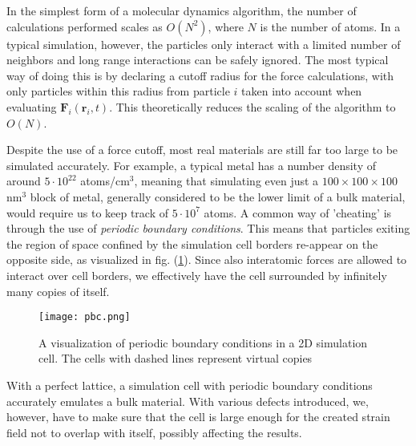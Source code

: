 In the simplest form of a molecular dynamics algorithm, the number of calculations performed scales as $O(N^2)$, where $N$ is the number of atoms. 
In a typical simulation, however, the particles only interact with a limited number of neighbors and long range interactions can be safely ignored. 
The most typical way of doing this is by declaring a cutoff radius for the force calculations, with only particles within this radius from particle $i$ taken into account when evaluating $\mathbf{F}_i(\mathbf{r}_i,t)$. 
This theoretically reduces the scaling of the algorithm to $O(N)$.

Despite the use of a force cutoff, most real materials are still far too large to be simulated accurately.
For example, a typical metal has a number density of around $5\cdot 10^{22}$ atoms/cm$^3$, meaning that simulating even just a $100\times 100 \times 100$ nm$^3$ block of metal, generally considered to be the lower limit of a bulk material, would require us to keep track of $5\cdot 10^7$ atoms.
A common way of 'cheating' is through the use of \textit{periodic boundary conditions}. 
This means that particles exiting the region of space confined by the simulation cell borders re-appear on the opposite side, as visualized in fig. (\ref{Fig:pbcs}). 
Since also interatomic forces are allowed to interact over cell borders, we effectively have the cell surrounded by infinitely many copies of itself.

\begin{figure}[!ht]
\center
\texttt{[image: pbc.png]}
\caption{A visualization of periodic boundary conditions in a 2D simulation cell. The cells with dashed lines represent virtual copies}
\label{Fig:pbcs}
\end{figure}

With a perfect lattice, a simulation cell with periodic boundary conditions accurately emulates a bulk material. 
With various defects introduced, we, however, have to make sure that the cell is large enough for the created strain field not to overlap with itself, possibly affecting the results.

